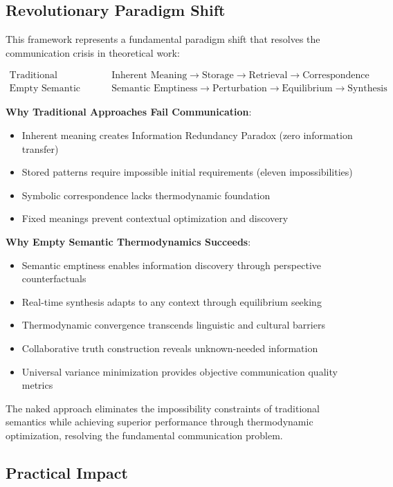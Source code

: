 \documentclass[11pt,a4paper]{article}
\begin{document}
\subsection{Revolutionary Paradigm Shift}

This framework represents a fundamental paradigm shift that resolves the communication crisis in theoretical work:

\begin{align}
\text{Traditional Semantics:} &\quad \text{Inherent Meaning} \to \text{Storage} \to \text{Retrieval} \to \text{Correspondence} \\
\text{Empty Semantic Thermodynamics:} &\quad \text{Semantic Emptiness} \to \text{Perturbation} \to \text{Equilibrium} \to \text{Synthesis}
\end{align}

\textbf{Why Traditional Approaches Fail Communication}:
\begin{itemize}
\item Inherent meaning creates Information Redundancy Paradox (zero information transfer)
\item Stored patterns require impossible initial requirements (eleven impossibilities)
\item Symbolic correspondence lacks thermodynamic foundation
\item Fixed meanings prevent contextual optimization and discovery
\end{itemize}

\textbf{Why Empty Semantic Thermodynamics Succeeds}:
\begin{itemize}
\item Semantic emptiness enables information discovery through perspective counterfactuals
\item Real-time synthesis adapts to any context through equilibrium seeking
\item Thermodynamic convergence transcends linguistic and cultural barriers
\item Collaborative truth construction reveals unknown-needed information
\item Universal variance minimization provides objective communication quality metrics
\end{itemize}

The naked approach eliminates the impossibility constraints of traditional semantics while achieving superior performance through thermodynamic optimization, resolving the fundamental communication problem.

\subsection{Practical Impact}
\end{document}
